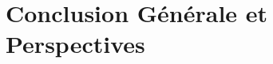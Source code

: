 \chapter*{Conclusion Générale et Perspectives}
\lipsum[1] \cite{ref1}
\paragraph{}
\lipsum[1] \cite{ref2}